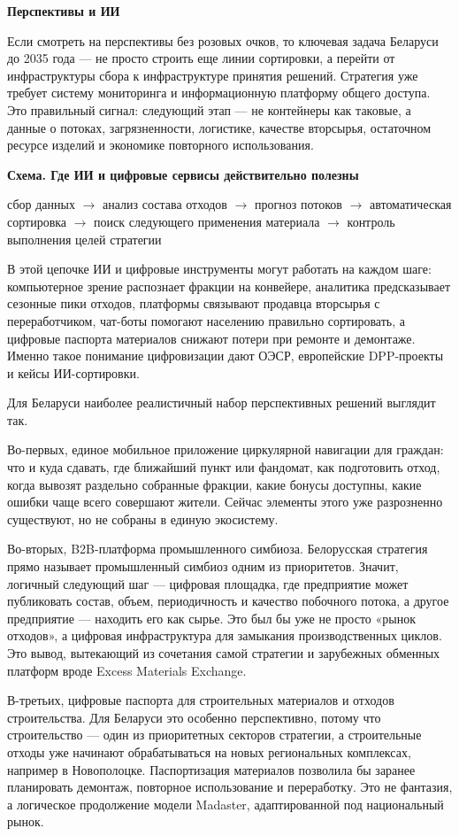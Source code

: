 \documentclass[14pt,a4paper]{extarticle}
\begin{document}
\textbf{Перспективы и ИИ}

Если смотреть на перспективы без розовых очков, то ключевая задача Беларуси до 2035 года --- не просто строить еще линии сортировки, а перейти от инфраструктуры сбора к инфраструктуре принятия решений. Стратегия уже требует систему мониторинга и информационную платформу общего доступа. Это правильный сигнал: следующий этап --- не контейнеры как таковые, а данные о потоках, загрязненности, логистике, качестве вторсырья, остаточном ресурсе изделий и экономике повторного использования.

\textbf{Схема. Где ИИ и цифровые сервисы действительно полезны}

сбор данных $\rightarrow$ анализ состава отходов $\rightarrow$ прогноз потоков $\rightarrow$ автоматическая сортировка $\rightarrow$ поиск следующего применения материала $\rightarrow$ контроль выполнения целей стратегии

В этой цепочке ИИ и цифровые инструменты могут работать на каждом шаге: компьютерное зрение распознает фракции на конвейере, аналитика предсказывает сезонные пики отходов, платформы связывают продавца вторсырья с переработчиком, чат-боты помогают населению правильно сортировать, а цифровые паспорта материалов снижают потери при ремонте и демонтаже. Именно такое понимание цифровизации дают ОЭСР, европейские DPP-проекты и кейсы ИИ-сортировки.

Для Беларуси наиболее реалистичный набор перспективных решений выглядит так.

Во-первых, единое мобильное приложение циркулярной навигации для граждан: что и куда сдавать, где ближайший пункт или фандомат, как подготовить отход, когда вывозят раздельно собранные фракции, какие бонусы доступны, какие ошибки чаще всего совершают жители. Сейчас элементы этого уже разрозненно существуют, но не собраны в единую экосистему.

Во-вторых, B2B-платформа промышленного симбиоза. Белорусская стратегия прямо называет промышленный симбиоз одним из приоритетов. Значит, логичный следующий шаг --- цифровая площадка, где предприятие может публиковать состав, объем, периодичность и качество побочного потока, а другое предприятие --- находить его как сырье. Это был бы уже не просто «рынок отходов», а цифровая инфраструктура для замыкания производственных циклов. Это вывод, вытекающий из сочетания самой стратегии и зарубежных обменных платформ вроде Excess Materials Exchange.

В-третьих, цифровые паспорта для строительных материалов и отходов строительства. Для Беларуси это особенно перспективно, потому что строительство --- один из приоритетных секторов стратегии, а строительные отходы уже начинают обрабатываться на новых региональных комплексах, например в Новополоцке. Паспортизация материалов позволила бы заранее планировать демонтаж, повторное использование и переработку. Это не фантазия, а логическое продолжение модели Madaster, адаптированной под национальный рынок.
\end{document}
